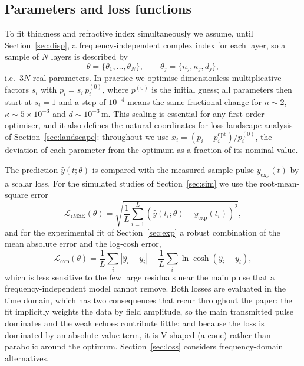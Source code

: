 \documentclass{optica-article}
\newcommand{\kap}{\kappa}
\newcommand{\Lt}{\mathcal{L}}
\begin{document}
\subsection{Parameters and loss functions}
To fit thickness and refractive index simultaneously we assume, until Section~\ref{sec:disp}, a frequency-independent complex index for each layer, so a sample of $N$ layers is described by
\begin{equation}
  \theta=\{\theta_1,\dots,\theta_N\},\qquad \theta_j=\{n_j,\kap_j,d_j\},
\end{equation}
i.e.\ $3N$ real parameters. In practice we optimise dimensionless multiplicative factors $s_i$ with $p_i = s_i\,p_i^{(0)}$, where $p^{(0)}$ is the initial guess; all parameters then start at $s_i=1$ and a step of $10^{-4}$ means the same fractional change for $n\sim2$, $\kap\sim5\times10^{-3}$ and $d\sim10^{-3}\,\si{\metre}$. This scaling is essential for any first-order optimiser, and it also defines the natural coordinates for loss landscape analysis of Section~\ref{sec:landscape}: throughout we use $x_i=(p_i-p_i^{\mathrm{opt}})/p_i^{(0)}$, the deviation of each parameter from the optimum as a fraction of its nominal value.

The prediction $\hat y(t;\theta)$ is compared with the measured sample pulse $y_{\mathrm{exp}}(t)$ by a scalar loss. For the simulated studies of Section~\ref{sec:sim} we use the root-mean-square error
\begin{equation}
  \Lt_{\mathrm{rMSE}}(\theta)=\sqrt{\frac{1}{L}\sum_{i=1}^{L}\left(\hat y(t_i;\theta)-y_{\mathrm{exp}}(t_i)\right)^2},
  \label{eq:rmse}
\end{equation}
and for the experimental fit of Section~\ref{sec:exp} a robust combination of the mean absolute error and the log-cosh error,
\begin{equation}
  \Lt_{\mathrm{exp}}(\theta)=\frac{1}{L}\sum_i\left|\hat y_i-y_i\right| + \frac{1}{L}\sum_i \ln\cosh\!\left(\hat y_i-y_i\right),
  \label{eq:lossexp}
\end{equation}
which is less sensitive to the few large residuals near the main pulse that a frequency-independent model cannot remove. Both losses are evaluated in the time domain, which has two consequences that recur throughout the paper: the fit implicitly weights the data by field amplitude, so the main transmitted pulse dominates and the weak echoes contribute little; and because the loss is dominated by an absolute-value term, it is V-shaped (a cone) rather than parabolic around the optimum. Section~\ref{sec:loss} considers frequency-domain alternatives.
\end{document}
